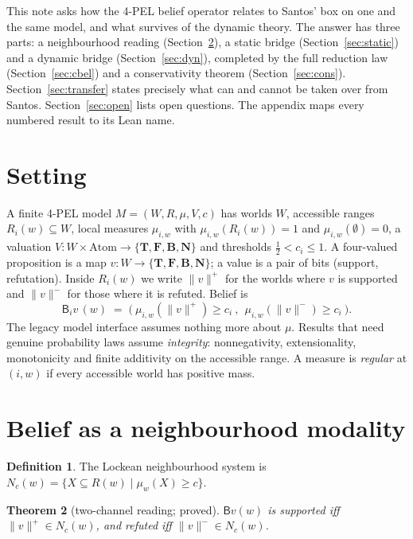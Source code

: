 \documentclass[11pt,a4paper]{article}
\newtheorem{theorem}{Theorem}[section]
\theoremstyle{definition}
\newtheorem{definition}[theorem]{Definition}
\theoremstyle{remark}
\newcommand{\Tv}{\mathbf{T}}\newcommand{\Fv}{\mathbf{F}}
\newcommand{\Bv}{\mathbf{B}}\newcommand{\Nv}{\mathbf{N}}
\newcommand{\Bel}{\mathsf{B}}
\newcommand{\pos}[1]{\lVert #1\rVert^{+}}
\newcommand{\negx}[1]{\lVert #1\rVert^{-}}
\begin{document}
This note asks how the 4-PEL belief operator relates to Santos' box on one and the same
model, and what survives of the dynamic theory. The answer has three parts:
a neighbourhood reading (Section~\ref{sec:nbhd}), a static bridge
(Section~\ref{sec:static}) and a dynamic bridge (Section~\ref{sec:dyn}), completed by
the full reduction law (Section~\ref{sec:cbel}) and a conservativity theorem
(Section~\ref{sec:cons}).
Section~\ref{sec:transfer} states precisely what can and cannot be taken over from
Santos. Section~\ref{sec:open} lists open questions. The appendix maps every numbered
result to its Lean name.

\section{Setting}

A finite 4-PEL model $M=(W,R,\mu,V,c)$ has worlds $W$, accessible ranges $R_i(w)\subseteq W$,
local measures $\mu_{i,w}$ with $\mu_{i,w}(R_i(w))=1$ and $\mu_{i,w}(\emptyset)=0$,
a valuation $V\colon W\times\mathrm{Atom}\to\{\Tv,\Fv,\Bv,\Nv\}$ and thresholds
$\tfrac12<c_i\le 1$. A four-valued proposition is a map $v\colon W\to\{\Tv,\Fv,\Bv,\Nv\}$;
a value is a pair of bits (support, refutation). Inside $R_i(w)$ we write
$\pos{v}$ for the worlds where $v$ is supported and $\negx{v}$ for those where it is refuted.
Belief is
\[
\Bel_i v\,(w) \;=\; \bigl(\ \mu_{i,w}(\pos{v})\ge c_i\ ,\ \ \mu_{i,w}(\negx{v})\ge c_i\ \bigr).
\]
The legacy model interface assumes nothing more about $\mu$. Results that need genuine
probability laws assume \emph{integrity}: nonnegativity, extensionality, monotonicity and
finite additivity on the accessible range. A measure is \emph{regular} at $(i,w)$ if every
accessible world has positive mass.

\section{Belief as a neighbourhood modality}\label{sec:nbhd}

\begin{definition}
The Lockean neighbourhood system is $N_c(w)=\{X\subseteq R(w)\mid \mu_w(X)\ge c\}$.
\end{definition}

\begin{theorem}[two-channel reading; proved]\label{thm:channels}
$\Bel v(w)$ is supported iff $\pos{v}\in N_c(w)$, and refuted iff $\negx{v}\in N_c(w)$.
\end{theorem}
\end{document}
